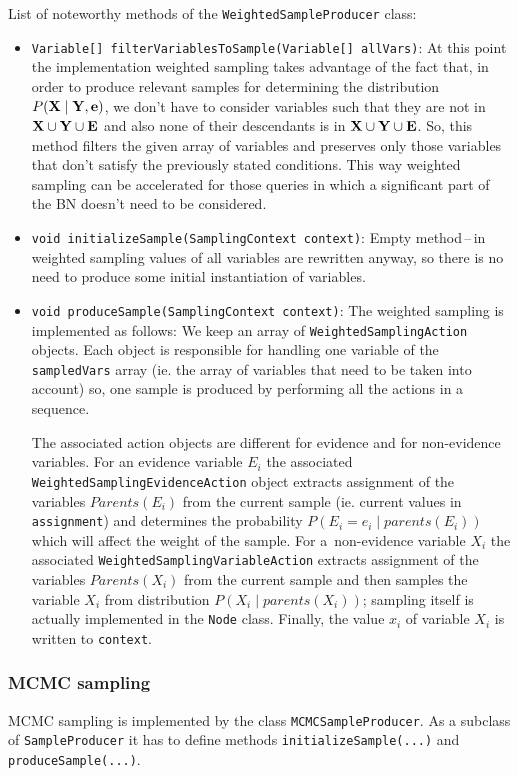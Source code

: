 \documentclass[english,cover]{fitthesis} %
\newcommand{\srccode}[1]{{\tt #1}}         %
\newcommand{\vars}[1]{{\bold{#1}}}         %
\begin{document}
\medskip
List of noteworthy methods of the \srccode{WeightedSampleProducer} class:
\begin{itemize}
	\item \srccode{Variable[] filterVariablesToSample(Variable[] allVars)}: At this point the implementation weighted sampling takes advantage of the fact that, in order to produce relevant samples for determining the distribution $P(\vars{X} \mid \vars{Y}, \vars{e})$, we don't have to consider variables such that they are not in $\vars{X} \cup \vars{Y} \cup \vars{E}$ and also none of their descendants is in $\vars{X} \cup \vars{Y} \cup \vars{E}$. So, this method filters the given array of variables and preserves only those variables that don't satisfy the previously stated conditions. This way weighted sampling can be accelerated for those queries in which a significant part of the BN doesn't need to be considered.
	\item \srccode{void initializeSample(SamplingContext context)}: Empty method\,--\,in weighted sampling values of all variables are rewritten anyway, so there is no need to produce some initial instantiation of variables.
	\item \srccode{void produceSample(SamplingContext context)}: The weighted sampling is implemented as follows: We keep an array of \srccode{WeightedSamplingAction} objects. Each object is responsible for handling one variable of the \srccode{sampledVars} array (ie. the array of variables that need to be taken into account) so, one sample is produced by performing all the actions in a sequence.
	
	The associated action objects are different for evidence and for non-evidence variables.	For an evidence variable $E_i$ the associated \srccode{WeightedSamplingEvidenceAction} object extracts assignment of the variables $Parents(E_i)$ from the current sample (ie. current values in \srccode{assignment}) and determines the probability $P(E_i = e_i \mid parents(E_i))$ which will affect the weight of the sample.
	For a~non-evidence variable $X_i$ the associated \srccode{WeightedSamplingVariableAction} extracts assignment of the variables $Parents(X_i)$ from the current sample and then samples the variable $X_i$ from distribution $P(X_i \mid parents(X_i))$; sampling itself is actually implemented in the \srccode{Node} class. Finally, the value $x_i$ of variable $X_i$ is written to \srccode{context}.
\end{itemize}


\subsubsection{MCMC sampling}
MCMC sampling is implemented by the class \srccode{MCMCSampleProducer}. As a subclass of \srccode{SampleProducer} it has to define methods \srccode{initializeSample(...)} and \srccode{produceSample(...)}.
\end{document}
